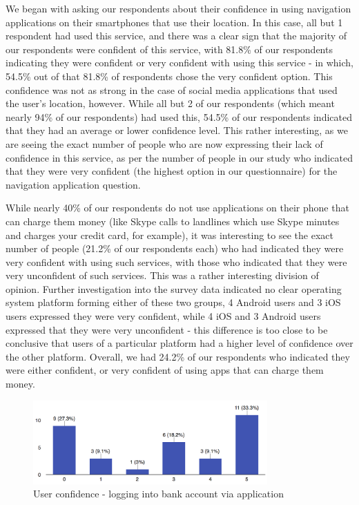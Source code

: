 \documentclass{sigchi}
\begin{document}
We began with asking our respondents about their confidence in using navigation applications on their smartphones that use their location. In this case, all but 1 respondent had used this service, and there was a clear sign that the majority of our respondents were confident of this service, with 81.8\% of our respondents indicating they were confident or very confident with using this service - in which, 54.5\% out of that 81.8\% of respondents chose the very confident option. This confidence was not as strong in the case of social media applications that used the user's location, however. While all but 2 of our respondents (which meant nearly 94\% of our respondents) had used this, 54.5\% of our respondents indicated that they had an average or lower confidence level. This rather interesting, as we are seeing the exact number of people who are now expressing their lack of confidence in this service, as per the number of people in our study who indicated that they were very confident (the highest option in our questionnaire) for the navigation application question.

While nearly 40\% of our respondents do not use applications on their phone that can charge them money (like Skype calls to landlines which use Skype minutes and charges your credit card, for example), it was interesting to see the exact number of people (21.2\% of our respondents each) who had indicated they were very confident with using such services, with those who indicated that they were very unconfident of such services. This was a rather interesting division of opinion. Further investigation into the survey data indicated no clear operating system platform forming either of these two groups, 4 Android users and 3 iOS users expressed they were very confident, while 4 iOS and 3 Android users expressed that they were very unconfident - this difference is too close to be conclusive that users of a particular platform had a higher level of confidence over the other platform. Overall, we had 24.2\% of our respondents who indicated they were either confident, or very confident of using apps that can charge them money.

\begin{figure}[h]
    \includegraphics[height=3.2cm]{Banking_with_app}
    \caption{User confidence - logging into bank account via application}
    \label{fig:BankAppConfidence}
\end{figure}
\end{document}
